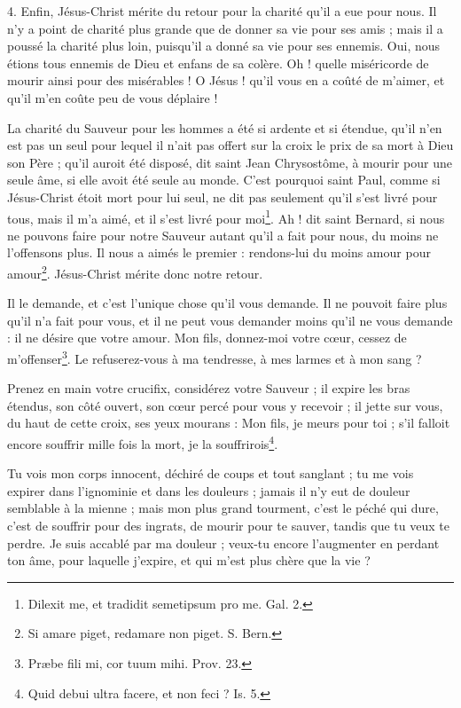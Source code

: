 \documentclass[instructions.tex]{subfiles}
\begin{document}
4. Enfin, Jésus-Christ mérite du retour pour la charité qu'il a eue pour nous. Il n'y a point de charité plus grande que de donner sa vie pour ses amis ; mais il a poussé la charité plus loin, puisqu'il a donné sa vie pour ses ennemis. Oui, nous étions tous ennemis de Dieu et enfans de sa colère. Oh ! quelle miséricorde de mourir ainsi pour des misérables ! O Jésus ! qu'il vous en a coûté de m'aimer, et qu'il m'en coûte peu de vous déplaire !

La charité du Sauveur pour les hommes a été si ardente et si étendue, qu'il n'en est pas un seul pour lequel il n'ait pas offert sur la croix le prix de sa mort à Dieu son Père ; qu'il auroit été disposé, dit saint Jean Chrysostôme, à mourir pour une seule âme, si elle avoit été seule au monde. C'est pourquoi saint Paul, comme si Jésus-Christ étoit mort pour lui seul, ne dit pas seulement qu'il s'est livré pour tous, mais il m'a aimé, et il s'est livré pour moi\footnote{Dilexit me, et tradidit semetipsum pro me. Gal. 2.}. Ah ! dit saint Bernard, si nous ne pouvons faire pour notre Sauveur autant qu'il a fait pour nous, du moins ne l'offensons plus. Il nous a aimés le premier : rendons-lui du moins amour pour amour\footnote{Si amare piget, redamare non piget. S. Bern.}. Jésus-Christ mérite donc notre retour.

\secundo Il le demande, et c'est l'unique chose qu'il vous demande. Il ne pouvoit faire plus qu'il n'a fait pour vous, et il ne peut vous demander moins qu'il ne vous demande : il ne désire que votre amour. Mon fils, donnez-moi votre cœur, cessez de m'offenser\footnote{Præbe fili mi, cor tuum mihi. Prov. 23.}. Le refuserez-vous à ma tendresse, à mes larmes et à mon sang ?

Prenez en main votre crucifix, considérez votre Sauveur ; il expire les bras étendus, son côté ouvert, son cœur percé pour vous y recevoir ; il jette sur vous, du haut de cette croix, ses yeux mourans : Mon fils, je meurs pour toi ; s'il falloit encore souffrir mille fois la mort, je la souffrirois\footnote{Quid debui ultra facere, et non feci ? Is. 5.}.

Tu vois mon corps innocent, déchiré de coups et tout sanglant ; tu me vois expirer dans l'ignominie et dans les douleurs ; jamais il n'y eut de douleur semblable à la mienne ; mais mon plus grand tourment, c'est le péché qui dure, c'est de souffrir pour des ingrats, de mourir pour te sauver, tandis que tu veux te perdre. Je suis accablé par ma douleur ; veux-tu encore l'augmenter en perdant ton âme, pour laquelle j'expire, et qui m'est plus chère que la vie ?
\end{document}
